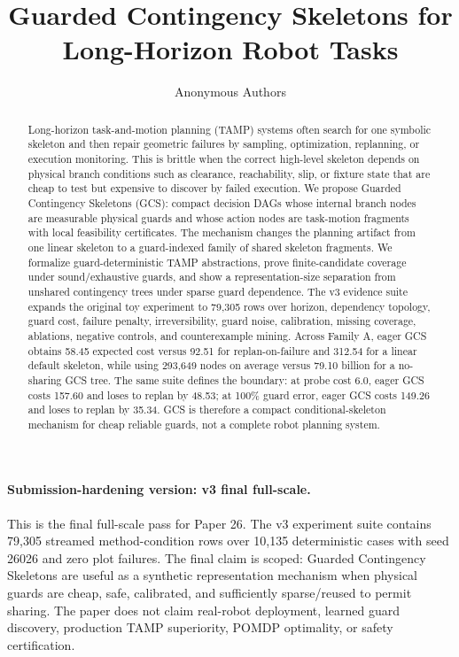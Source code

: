 \documentclass{article}
\title{Guarded Contingency Skeletons for Long-Horizon Robot Tasks}
\author{Anonymous Authors}
\begin{document}
\maketitle

\paragraph{Submission-hardening version: v3 final full-scale.}
This is the final full-scale pass for Paper 26. The v3 experiment suite contains 79,305 streamed method-condition rows over 10,135 deterministic cases with seed 26026 and zero plot failures. The final claim is scoped: Guarded Contingency Skeletons are useful as a synthetic representation mechanism when physical guards are cheap, safe, calibrated, and sufficiently sparse/reused to permit sharing. The paper does not claim real-robot deployment, learned guard discovery, production TAMP superiority, POMDP optimality, or safety certification.

\begin{abstract}
Long-horizon task-and-motion planning (TAMP) systems often search for one symbolic skeleton and then repair geometric failures by sampling, optimization, replanning, or execution monitoring. This is brittle when the correct high-level skeleton depends on physical branch conditions such as clearance, reachability, slip, or fixture state that are cheap to test but expensive to discover by failed execution. We propose Guarded Contingency Skeletons (GCS): compact decision DAGs whose internal branch nodes are measurable physical guards and whose action nodes are task-motion fragments with local feasibility certificates. The mechanism changes the planning artifact from one linear skeleton to a guard-indexed family of shared skeleton fragments. We formalize guard-deterministic TAMP abstractions, prove finite-candidate coverage under sound/exhaustive guards, and show a representation-size separation from unshared contingency trees under sparse guard dependence. The v3 evidence suite expands the original toy experiment to 79,305 rows over horizon, dependency topology, guard cost, failure penalty, irreversibility, guard noise, calibration, missing coverage, ablations, negative controls, and counterexample mining. Across Family A, eager GCS obtains 58.45 expected cost versus 92.51 for replan-on-failure and 312.54 for a linear default skeleton, while using 293,649 nodes on average versus 79.10 billion for a no-sharing GCS tree. The same suite defines the boundary: at probe cost 6.0, eager GCS costs 157.60 and loses to replan by 48.53; at 100\% guard error, eager GCS costs 149.26 and loses to replan by 35.34. GCS is therefore a compact conditional-skeleton mechanism for cheap reliable guards, not a complete robot planning system.
\end{abstract}
\end{document}
